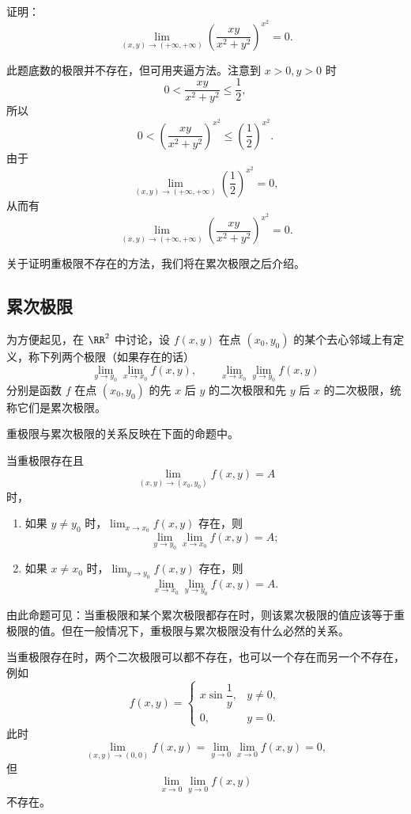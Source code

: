 \begin{xexample}[18.1.5]
证明：
\[
  \lim_{(x,y)\to(+\infty,+\infty)}
  \left(\frac{xy}{x^2+y^2}\right)^{x^2}=0.
\]
\end{xexample}
\begin{xproof}
此题底数的极限并不存在，但可用夹逼方法。注意到 $x>0,y>0$ 时
\[
  0<\frac{xy}{x^2+y^2}\le\frac12,
\]
所以
\[
  0<\left(\frac{xy}{x^2+y^2}\right)^{x^2}
  \le\left(\frac12\right)^{x^2}.
\]
由于
\[
  \lim_{(x,y)\to(+\infty,+\infty)}\left(\frac12\right)^{x^2}=0,
\]
从而有
\[
  \lim_{(x,y)\to(+\infty,+\infty)}
  \left(\frac{xy}{x^2+y^2}\right)^{x^2}=0.
\]
\end{xproof}

关于证明重极限不存在的方法，我们将在累次极限之后介绍。

\subsection{累次极限}

为方便起见，在 $\RR^2$ 中讨论，设 $f(x,y)$ 在点 $(x_0,y_0)$ 的某个去心邻域上有定义，称下列两个极限（如果存在的话）
\[
  \lim_{y\to y_0}\lim_{x\to x_0}f(x,y),
  \qquad
  \lim_{x\to x_0}\lim_{y\to y_0}f(x,y)
\]
分别是函数 $f$ 在点 $(x_0,y_0)$ 的先 $x$ 后 $y$ 的二次极限和先 $y$ 后 $x$ 的二次极限，统称它们是累次极限。

重极限与累次极限的关系反映在下面的命题中。

\begin{xproposition}[18.1.1]
当重极限存在且
\[
  \lim_{(x,y)\to(x_0,y_0)}f(x,y)=A
\]
时，
\begin{enumerate}[label=(\arabic*)]
  \item 如果 $y\ne y_0$ 时，$\displaystyle\lim_{x\to x_0}f(x,y)$ 存在，则
  \[
    \lim_{y\to y_0}\lim_{x\to x_0}f(x,y)=A;
  \]
  \item 如果 $x\ne x_0$ 时，$\displaystyle\lim_{y\to y_0}f(x,y)$ 存在，则
  \[
    \lim_{x\to x_0}\lim_{y\to y_0}f(x,y)=A.
  \]
\end{enumerate}
\end{xproposition}

由此命题可见：当重极限和某个累次极限都存在时，则该累次极限的值应该等于重极限的值。但在一般情况下，重极限与累次极限没有什么必然的关系。

当重极限存在时，两个二次极限可以都不存在，也可以一个存在而另一个不存在，例如
\[
  f(x,y)=
  \begin{cases}
    x\sin\dfrac1y, & y\ne0,\\[4pt]
    0, & y=0.
  \end{cases}
\]
此时
\[
  \lim_{(x,y)\to(0,0)}f(x,y)
  =\lim_{y\to0}\lim_{x\to0}f(x,y)=0,
\]
但
\[
  \lim_{x\to0}\lim_{y\to0}f(x,y)
\]
不存在。

